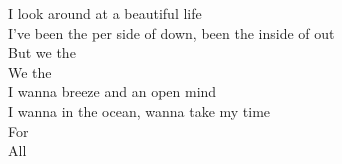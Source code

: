 \songwordfb{} I look around at a beautiful life \\
I've been the per side of down, been the inside of out \\
But we the \\
We the \\
\songwordfb{} I wanna breeze and an open mind \\
I wanna  in the ocean, wanna take my time \\
For  \\
All  \\
